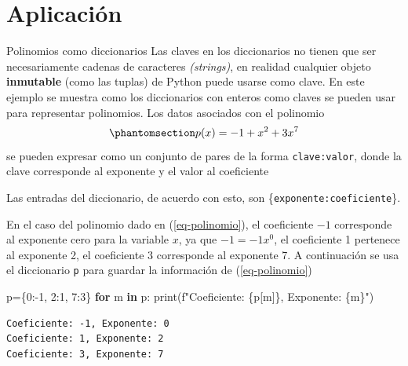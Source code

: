 \documentclass[
  ignorenonframetext,
  aspectratio=169,
  spanish,
]{beamer}
\newenvironment{Shaded}{\begin{snugshade}}{\end{snugshade}}
\newcommand{\BuiltInTok}[1]{\textcolor[rgb]{0.00,0.23,0.31}{#1}}
\newcommand{\ControlFlowTok}[1]{\textcolor[rgb]{0.00,0.23,0.31}{\textbf{#1}}}
\newcommand{\DecValTok}[1]{\textcolor[rgb]{0.68,0.00,0.00}{#1}}
\newcommand{\KeywordTok}[1]{\textcolor[rgb]{0.00,0.23,0.31}{\textbf{#1}}}
\newcommand{\NormalTok}[1]{\textcolor[rgb]{0.00,0.23,0.31}{#1}}
\newcommand{\OperatorTok}[1]{\textcolor[rgb]{0.37,0.37,0.37}{#1}}
\newcommand{\SpecialCharTok}[1]{\textcolor[rgb]{0.37,0.37,0.37}{#1}}
\newcommand{\SpecialStringTok}[1]{\textcolor[rgb]{0.13,0.47,0.30}{#1}}
\begin{document}
\section{Aplicación}\label{aplicaciuxf3n}

\begin{frame}[fragile]{Polinomios como diccionarios}
\label{polinomios-como-diccionarios}
Las claves en los diccionarios no tienen que ser necesariamente cadenas
de caracteres \emph{(strings)}, en realidad cualquier objeto
\textbf{inmutable} (como las tuplas) de Python puede usarse como clave.
En este ejemplo se muestra como los diccionarios con enteros como claves
se pueden usar para representar polinomios. Los datos asociados con el
polinomio
\begin{equation}\phantomsection\label{eq-polinomio}{p(x)=-1+x^2+3x^7 }\end{equation}
se pueden expresar como un conjunto de pares de la forma
\texttt{clave:valor}, donde la clave corresponde al exponente y el valor
al coeficiente
\end{frame}

\begin{frame}[fragile]{}
\label{section-1}
Las entradas del diccionario, de acuerdo con esto, son
\{\texttt{exponente:coeficiente}\}.

En el caso del polinomio dado en (\ref{eq-polinomio}), el coeficiente
\(-1\) corresponde al exponente cero para la variable \(x\), ya que
\(-1=-1x^0\), el coeficiente 1 pertenece al exponente 2, el coeficiente
3 corresponde al exponente 7. A continuación se usa el diccionario
\texttt{p} para guardar la información de (\ref{eq-polinomio})

\begin{Shaded}
\begin{Highlighting}[]
\NormalTok{p}\OperatorTok{=}\NormalTok{\{}\DecValTok{0}\NormalTok{:}\OperatorTok{{-}}\DecValTok{1}\NormalTok{, }\DecValTok{2}\NormalTok{:}\DecValTok{1}\NormalTok{, }\DecValTok{7}\NormalTok{:}\DecValTok{3}\NormalTok{\} }
\ControlFlowTok{for}\NormalTok{ m }\KeywordTok{in}\NormalTok{ p:}
        \BuiltInTok{print}\NormalTok{(}\SpecialStringTok{f"Coeficiente: }\SpecialCharTok{\{}\NormalTok{p[m]}\SpecialCharTok{\}}\SpecialStringTok{, Exponente: }\SpecialCharTok{\{}\NormalTok{m}\SpecialCharTok{\}}\SpecialStringTok{"}\NormalTok{)  }
\end{Highlighting}
\end{Shaded}

\begin{verbatim}
Coeficiente: -1, Exponente: 0
Coeficiente: 1, Exponente: 2
Coeficiente: 3, Exponente: 7
\end{verbatim}
\end{frame}
\end{document}
